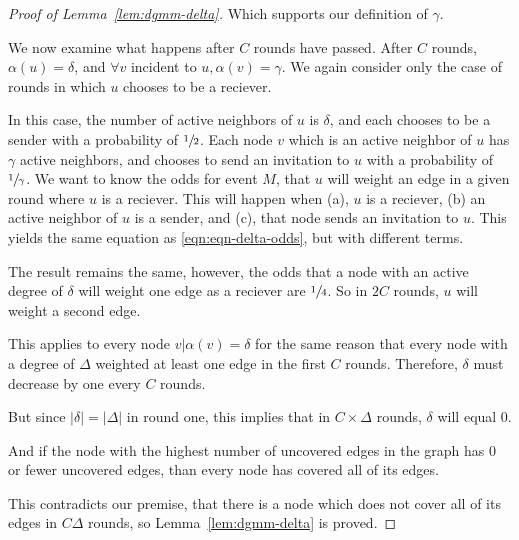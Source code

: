 \begin{proof}[Proof of Lemma~\ref{lem:dgmm-delta}]
    Which supports our definition of $\gamma$. 

    We now examine what happens after $C$ rounds have passed. After $C$ rounds, $\alpha(u) = \delta$, and $\forall v $ incident to $u, \alpha(v) = \gamma$. We again consider only the case of rounds in which $u$ chooses to be a reciever.

    In this case, the number of active neighbors of $u$ is $\delta$, and each chooses to be a sender with a probability of $\sfrac{1}{2}$. Each node $v$ which is an active neighbor of $u$ has $\gamma$ active neighbors, and chooses to send an invitation to $u$ with a probability of $\sfrac{1}{\gamma}$. We want to know the odds for event $M$, that $u$ will weight an edge in a given round where $u$ is a reciever. This will happen when (a), $u$ is a reciever, (b) an active neighbor of $u$ is a sender, and (c), that node sends an invitation to $u$. This yields the same equation as \eqref{eqn:eqn-delta-odds}, but with different terms.

    

    The result remains the same, however, the odds that a node with an active degree of $\delta$ will weight one edge as a reciever are $\sfrac{1}{4}$. So in $2C$ rounds, $u$ will weight a second edge.

    This applies to every node $v | \alpha(v) = \delta$ for the same reason that every node with a degree of $\Delta$ weighted at least one edge in the first $C$ rounds. Therefore, $\delta$ must decrease by one every $C$ rounds.

    But since $|\delta| = |\Delta|$ in round one, this implies that in $C \times \Delta$ rounds, $\delta$ will equal 0. 

    And if the node with the highest number of uncovered edges in the graph has 0 or fewer uncovered edges, than every node has covered all of its edges.

    This contradicts our premise, that there is a node which does not cover all of its edges in $C\Delta$ rounds, so Lemma~\ref{lem:dgmm-delta} is proved.
    \end{proof} 
